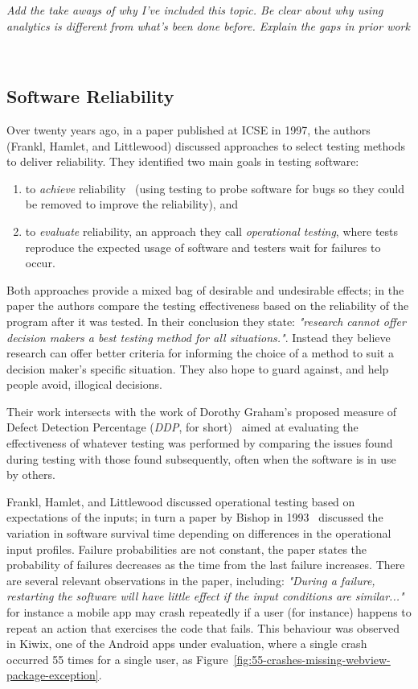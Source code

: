\emph{Add the take aways of why I've included this topic. Be clear about why using analytics is different from what's been done before. Explain the gaps in prior work}

~\hypertarget{software.reliability}{}
\subsection{Software Reliability}
Over twenty years ago, in a paper published at ICSE in 1997, the authors (Frankl, Hamlet, and Littlewood) discussed approaches to select testing methods to deliver reliability. They identified two main goals in testing software: 
\begin{enumerate}
    \item to \emph{achieve} reliability~ (using testing to probe software for bugs so they could be removed to improve the reliability), and 
    \item to \emph{evaluate} reliability, an approach they call \emph{operational testing}, where tests reproduce the expected usage of software and testers wait for failures to occur.
\end{enumerate}

Both approaches provide a mixed bag of desirable and undesirable effects; in the paper the authors compare the testing effectiveness based on the reliability of the program after it was tested. In their conclusion they state: \emph{"research cannot offer decision makers a best testing method for all situations."}. Instead they believe research can offer better criteria for informing the choice of a method to suit a decision maker's specific situation. They also hope to guard against, and help people avoid, illogical decisions.

Their work intersects with the work of Dorothy Graham's proposed measure of Defect Detection Percentage (\emph{DDP}, for short)~ aimed at evaluating the effectiveness of whatever testing was performed by comparing the issues found during testing with those found subsequently, often when the software is in use by others.

Frankl, Hamlet, and Littlewood discussed operational testing based on expectations of the inputs; in turn a paper by Bishop in 1993~ discussed the variation in software survival time depending on differences in the operational input profiles. Failure probabilities are not constant, the paper states the probability of failures decreases as the time from the last failure increases. There are several relevant observations in the paper, including: \emph{"During a failure, restarting the software will have little effect if the input conditions are similar..."} for instance a mobile app may crash repeatedly if a user (for instance) happens to repeat an action that exercises the code that fails. This behaviour was observed in Kiwix, one of the Android apps under evaluation, where a single crash occurred 55 times for a single user, as Figure~\ref{fig:55-crashes-missing-webview-package-exception}.

